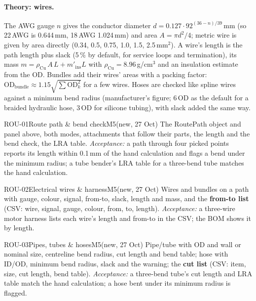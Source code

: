 \paragraph{Theory: wires.} The AWG gauge $n$ gives the conductor diameter
$d=0.127\cdot92^{(36-n)/39}$\,mm (so 22\,AWG is 0.644\,mm, 18\,AWG 1.024\,mm) and area $A=\pi d^2/4$; metric wire
is given by area directly (0.34, 0.5, 0.75, 1.0, 1.5, 2.5\,mm$^2$). A wire's length is the path length plus slack
(5\,\% by default, for service loops and termination), its mass $m=\rho_{\text{Cu}}\,A\,L+m'_{\text{ins}}L$
with $\rho_{\text{Cu}}=8.96$\,g/cm$^3$ and an insulation estimate from the OD. Bundles add their wires' areas
with a packing factor: $\text{OD}_{\text{bundle}}\approx1.15\sqrt{\sum \text{OD}_k^2}$ for a few wires.
Hoses are checked like spline wires against a minimum bend radius (manufacturer's figure; $6\,\text{OD}$ as the
default for a braided hydraulic hose, $3\,\text{OD}$ for silicone tubing), with slack added the same way.

\begin{epic}{ROU-01}{Route path \& bend check}{M5}{\stDone}{(new, 27 Oct)}
The RoutePath object and panel above, both modes, attachments that follow their parts, the length and the bend
check, the LRA table. \emph{Acceptance:} a path through four picked points reports its length within 0.1\,mm of
the hand calculation and flags a bend under the minimum radius; a tube bender's LRA table for a three-bend tube
matches the hand calculation.
\end{epic}

\begin{epic}{ROU-02}{Electrical wires \& harness}{M5}{\stDone}{(new, 27 Oct)}
Wires and bundles on a path with gauge, colour, signal, from-to, slack, length and mass, and the \textbf{from-to
list} (CSV: wire, signal, gauge, colour, from, to, length). \emph{Acceptance:} a three-wire motor harness lists each
wire's length and from-to in the CSV; the BOM shows it by length.
\end{epic}

\begin{epic}{ROU-03}{Pipes, tubes \& hoses}{M5}{\stDone}{(new, 27 Oct)}
Pipe/tube with OD and wall or nominal size, centreline bend radius, cut length and bend table; hose with ID/OD,
minimum bend radius, slack and the warning; the \textbf{cut list} (CSV: item, size, cut length, bend table).
\emph{Acceptance:} a three-bend tube's cut length and LRA table match the hand calculation; a hose bent under its
minimum radius is flagged.
\end{epic}

